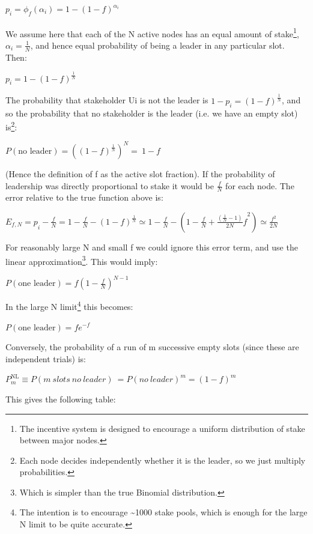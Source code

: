 \documentclass[11pt,a4paper]{article}
\begin{document}
\(p_{i} = {\phi_{f}\left( \alpha_{i} \right) = 1 - \left( 1 - f \right)^{\alpha_{i}}}_{}\)

We assume here that each of the N active nodes has an equal amount of
stake\footnote{The incentive system is designed to encourage a uniform
  distribution of stake between major nodes.},
\(\alpha_{i} = \frac{1}{N}\), and hence equal probability of being a
leader in any particular slot. Then:

\(p_{i}{= 1 - \left( 1 - f \right)^{\frac{1}{N}}}_{}\)

The probability that stakeholder Ui is not the leader is
\({1 - p}_{i} = \left( 1 - f \right)^{\frac{1}{N}}\), and so the
probability that no stakeholder is the leader (i.e. we have an empty
slot) is\footnote{Each node decides independently whether it is the
  leader, so we just multiply probabilities.}:

\(P\left( \text{no\ leader} \right) = \left( \left( 1 - f \right)^{\frac{1}{N}} \right)^{N} = \ 1 - f\)

(Hence the definition of f as the active slot fraction). If the
probability of leadership was directly proportional to stake it would be
\(\frac{f}{N}\) for each node. The error relative to the true function
above is:

\({E_{f,N} = p}_{i} - \frac{f}{N} = 1 - \frac{f}{N} - \left( 1 - f \right)^{\frac{1}{N}} \simeq 1 - \frac{f}{N} - \left( 1 - \frac{f}{N} + {\frac{\left( \frac{1}{N} - 1 \right)}{2N}f}^{2} \right) \simeq \frac{f^{2}}{2N}\)

For reasonably large N and small f we could ignore this error term, and
use the linear approximation\footnote{Which is simpler than the true
  Binomial distribution.}. This would imply:

\(P\left( \text{one\ leader} \right) = f\left( 1 - \frac{f}{N} \right)^{N - 1}\)

In the large N limit\footnote{The intention is to encourage
  \textasciitilde{}1000 stake pools, which is enough for the large N
  limit to be quite accurate.} this becomes:

\(P\left( \text{one\ leader} \right) = fe^{- f}\)

Conversely, the probability of a run of m successive empty slots (since
these are independent trials) is:

\(P_{m}^{\text{NL}} \equiv P(m\ slots\ no\ leader)\  = {P(no\ leader)}^{m} = \left( 1 - f \right)^{m}\)

This gives the following table:
\end{document}
